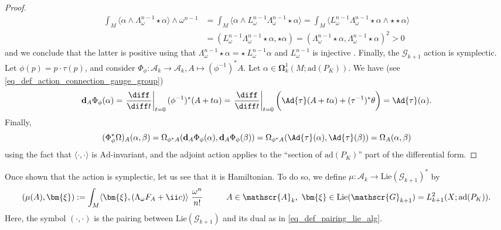 \begin{proof}
    \begin{align*}
        \int_M \langle \alpha \wedge \Lambda_\omega^{n-1} \star \alpha \rangle \wedge \omega^{n-1} & = \int_M \langle \alpha \wedge  L_\omega ^{n-1} \Lambda_\omega^{n-1} \star \alpha \rangle = \int_M \langle L_\omega ^{n-1} \Lambda_\omega^{n-1} \star \alpha \wedge \star \star \alpha \rangle \\
        & = (L_\omega^{n-1} \Lambda_\omega^{n-1} \star \alpha , \star \alpha) = (\Lambda_\omega^{n-1} \star\alpha,\Lambda_\omega^{n-1} \star\alpha)^2>0  
    \end{align*}
    and we conclude that the latter is positive using that \(\Lambda_\omega^{n-1} \star\alpha=\star \  L_\omega^{n-1} \alpha\) and \(L_\omega^{n-1}\) is injective \parencite[Lemma 9.39]{lee_introCM}. Finally, the \(\mathscr{G}_{k+1}\) action is symplectic. Let \(\phi(p)=p\cdot \tau(p)\), and consider \(\Phi_\phi\colon \mathscr{A}_k \to \mathscr{A}_k, A \mapsto (\phi^{-1})^*A\). Let \(\alpha \in \bm{\Omega}^1_k(M; \mathrm{ad}(P_K))\). We have (see \eqref{eq_def_action_connection_gauge_group})
    \[
    \mathbf{d}_A \Phi_\phi(\alpha)=\left. \frac{\diff}{\diff t}\right|_{t=0} (\phi^{-1})^*(A+t\alpha)=\left. \frac{\diff}{\diff t}\right|_{t=0} \bigg( \Ad{\tau}(A+t \alpha) + (\tau^{-1})^*\theta \bigg) = \Ad{\tau} (\alpha).
    \]
    Finally, 
    \[(\Phi_\phi^* \Omega)_A(\alpha, \beta)=\Omega_{\phi^*A}(\mathbf{d}_A \Phi_\phi(\alpha), \mathbf{d}_A \Phi_\phi(\beta))=\Omega_{\phi^*A}(\Ad{\tau}(\alpha), \Ad{\tau}(\beta))=\Omega_A(\alpha, \beta)
    \] 
    using the fact that \(\langle \cdot, \cdot \rangle\) is \(\mathrm{Ad}\)-invariant, and the adjoint action applies to the ``section of \(\mathrm{ad}(P_K)\)'' part of the differential form.
\end{proof}
Once shown that the action is symplectic, let us see that it is Hamiltonian. To do so, we define \(\mu \colon \mathscr{A}_k \to \mathrm{Lie}(\mathscr{G}_{k+1})^*\) by 
\begin{equation} \label{eq_def_moment_map}
 (\mu (A), \bm{\xi} ) :=\int_M \langle \bm{\xi}, (\Lambda_\omega F_A + \ii c) \rangle \  \frac{\omega^n}{n!} \hspace{1 cm} A \in \mathscr{A}_k, \ \bm{\xi}\in \mathrm{Lie}(\mathscr{G}_{k+1})=L^2_{k+1}(X; \mathrm{ad}(P_K)).
\end{equation}
Here, the symbol \((\cdot, \cdot) \) is the pairing between \(\mathrm{Lie}(\mathscr{G}_{k+1})\) and its dual as in \eqref{eq_def_pairing_lie_alg}.

